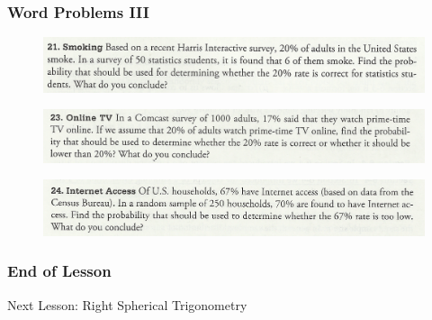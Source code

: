 \documentclass[xcolor=dvipsnames]{beamer}
\begin{document}
\begin{frame}
  \frametitle{Word Problems III}
  \begin{figure}[h]
    \includegraphics[scale=.7]{./triola4.png}
  \end{figure}
  \begin{figure}[h]
    \includegraphics[scale=.7]{./triola5.png}
  \end{figure}
  \begin{figure}[h]
    \includegraphics[scale=.7]{./triola6.png}
  \end{figure}
\end{frame}

\begin{frame}
  \frametitle{End of Lesson}
Next Lesson: Right Spherical Trigonometry
\end{frame}
\end{document}
